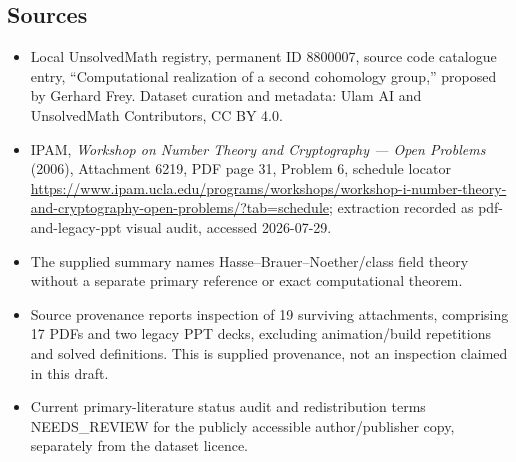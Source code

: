 \documentclass[11pt]{article}
\begin{document}
\subsection{Sources}
\begin{itemize}
\item Local UnsolvedMath registry, permanent ID 8800007, source code catalogue entry, ``Computational realization of a second cohomology group,'' proposed by Gerhard Frey. Dataset curation and metadata: Ulam AI and UnsolvedMath Contributors, CC BY 4.0.
\item IPAM, \emph{Workshop on Number Theory and Cryptography --- Open Problems} (2006), Attachment 6219, PDF page 31, Problem 6, schedule locator \url{https://www.ipam.ucla.edu/programs/workshops/workshop-i-number-theory-and-cryptography-open-problems/?tab=schedule}; extraction recorded as pdf-and-legacy-ppt visual audit, accessed 2026-07-29.
\item The supplied summary names Hasse--Brauer--Noether/class field theory without a separate primary reference or exact computational theorem.
\item Source provenance reports inspection of 19 surviving attachments, comprising 17 PDFs and two legacy PPT decks, excluding animation/build repetitions and solved definitions. This is supplied provenance, not an inspection claimed in this draft.
\item Current primary-literature status audit and redistribution terms NEEDS\_REVIEW for the publicly accessible author/publisher copy, separately from the dataset licence.
\end{itemize}
\end{document}
